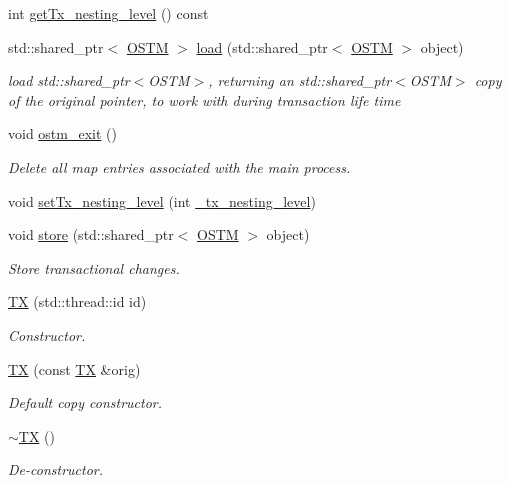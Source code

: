 \begin{DoxyCompactItemize}
int \hyperlink{class_t_x_afc42d088f325b349e70651fb454e6a44_afc42d088f325b349e70651fb454e6a44}{get\+Tx\+\_\+nesting\+\_\+level} () const 
\item 
std\+::shared\+\_\+ptr$<$ \hyperlink{class_o_s_t_m}{O\+S\+TM} $>$ \hyperlink{class_t_x_a1d78262b8831ddd042ed491f2e600e24_a1d78262b8831ddd042ed491f2e600e24}{load} (std\+::shared\+\_\+ptr$<$ \hyperlink{class_o_s_t_m}{O\+S\+TM} $>$ object)
\begin{DoxyCompactList}\small\item\em load std\+::shared\+\_\+ptr$<$\+O\+S\+T\+M$>$, returning an std\+::shared\+\_\+ptr$<$\+O\+S\+T\+M$>$ copy of the original pointer, to work with during transaction life time \end{DoxyCompactList}\item 
void \hyperlink{class_t_x_aa9739c5c2077454c779098db7baefc2b_aa9739c5c2077454c779098db7baefc2b}{ostm\+\_\+exit} ()
\begin{DoxyCompactList}\small\item\em Delete all map entries associated with the main process. \end{DoxyCompactList}\item 
void \hyperlink{class_t_x_aef4636bd446ddca0a399bb5bd438dfde_aef4636bd446ddca0a399bb5bd438dfde}{set\+Tx\+\_\+nesting\+\_\+level} (int \hyperlink{class_t_x_ae8f413fd7f4fea322e7ad3c668f9898e_ae8f413fd7f4fea322e7ad3c668f9898e}{\+\_\+tx\+\_\+nesting\+\_\+level})
\item 
void \hyperlink{class_t_x_a7dbcb369aa4a3370b6c6829d278ece5d_a7dbcb369aa4a3370b6c6829d278ece5d}{store} (std\+::shared\+\_\+ptr$<$ \hyperlink{class_o_s_t_m}{O\+S\+TM} $>$ object)
\begin{DoxyCompactList}\small\item\em Store transactional changes. \end{DoxyCompactList}\item 
\hyperlink{class_t_x_a8a4b83eab0171ae834bfa92bbced1094_a8a4b83eab0171ae834bfa92bbced1094}{TX} (std\+::thread\+::id id)
\begin{DoxyCompactList}\small\item\em Constructor. \end{DoxyCompactList}\item 
\hyperlink{class_t_x_ab96b3dd2bfd621b47307f0af3ec4f35c_ab96b3dd2bfd621b47307f0af3ec4f35c}{TX} (const \hyperlink{class_t_x}{TX} \&orig)
\begin{DoxyCompactList}\small\item\em Default copy constructor. \end{DoxyCompactList}\item 
\hyperlink{class_t_x_abecf854cc3228ab6dd51175b3cd1c70a_abecf854cc3228ab6dd51175b3cd1c70a}{$\sim$\+TX} ()
\begin{DoxyCompactList}\small\item\em De-\/constructor. \end{DoxyCompactList}\end{DoxyCompactItemize}
